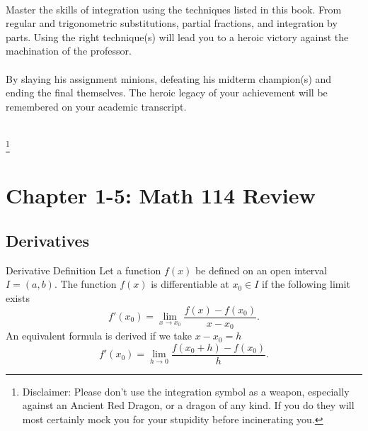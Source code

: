 \documentclass[letterpaper,10pt,twoside,twocolumn,openany]{book}
\begin{document}
                       
\frontmatter                           
\begin{titlepage}
    ~
    \newpage
    
    \begin{center}
        

        \large
        \vspace*{\fill}
        Master the skills of integration using the techniques listed in this book. From regular and trigonometric substitutions, partial fractions, and integration by parts. Using the right technique(s) will lead you to a heroic victory against the machination of the professor. 
        \\~\\
        By slaying his assignment minions, defeating his midterm champion(s) and ending the final themselves. The heroic legacy of your achievement will be remembered on your academic transcript.
        \\~\\
        \vspace*{\fill}

    \end{center}
    \let\thefootnote\relax\footnote{Disclaimer: Please don't use the integration symbol as a weapon, especially against an Ancient Red Dragon, or a dragon of any kind. If you do they will most certainly mock you for your stupidity before incinerating you.}
\end{titlepage}

\tableofcontents                        %
\mainmatter                             %

                        
\chapter{Chapter 1-5: Math 114 Review}                %
\section{Derivatives}
\begin{paperbox}{Derivative Definition}
    Let a function $f ( x)$ be defined on an open interval $I = ( a, b)$. The function $f ( x)$ is differentiable at $x_0 \in I$ if the following limit exists
    \[ f' ( x_0) = \lim_{x \rightarrow x_0} \frac{f ( x) - f ( x_0)}{x - x_0} . \]
    An equivalent formula is derived if we take $x - x_0 = h$
    \[ f' ( x_0) = \lim_{h \rightarrow 0} \frac{f ( x_0 + h) - f ( x_0)}{h} . \]
\end{paperbox}
\end{document}
